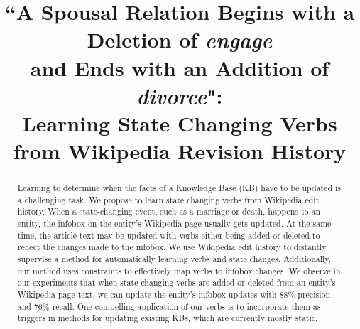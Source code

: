 \documentclass[11pt,a4paper]{article}
\title{``A Spousal Relation Begins with a Deletion of \textit{engage} \\and Ends with an Addition of \textit{divorce}": \\
Learning State Changing Verbs from Wikipedia Revision History}
\author{%
  }
\date{}
\begin{document}
\maketitle


\begin{abstract}


Learning to determine when the facts of a Knowledge Base (KB) have to be updated is a challenging task.
We propose to learn state changing verbs from Wikipedia edit history. When a state-changing event,  such as a marriage or death,  happens to an entity, the  infobox on the entity's Wikipedia page usually gets  updated. At the same time, the  article text may be updated with verbs either being added or deleted to reflect the changes made to the infobox. We use Wikipedia edit history %
to distantly supervise a method for automatically learning verbs and state changes. Additionally, our method uses %
constraints
  to effectively map verbs to infobox changes. We observe in our experiments that when state-changing verbs are  added or deleted from an entity's Wikipedia  page text, we can update the entity's infobox updates with 88\% precision and 76\% recall.
One compelling  application of our verbs is to incorporate them as triggers in methods for   updating existing KBs, which are currently mostly static.

\end{abstract}








\end{document}
